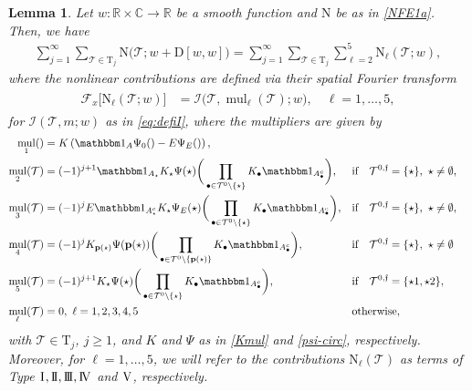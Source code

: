 \documentclass[a4paper,
11pt,  reqno]{amsart}
\makeatletter
\newcommand{\I}{\hspace{0.2mm}\textup{I}\hspace{0.2mm}}
\newcommand{\II}{\textup{I \hspace{-2.9mm} I} }
\newcommand{\III}{\textup{I \hspace{-2.9mm} I \hspace{-2.9mm} I}}
\newcommand{\IV}{\textup{I \hspace{-2.9mm} V}}
\newcommand{\5}{\textup{V}}
\newcommand{\ind}{\mathbbm 1}
\newtheorem{lemma}[theorem]{Lemma}
\theoremstyle{remark}
\newcommand{\R}{\mathbb{R}}
\newcommand{\CC}{\mathbb{C}}
\newcommand{\bul}{\bullet}
\newcommand{\TT}{\mathcal{T}}
\newcommand{\Tr}{\mathrm{T}}
\newcommand{\pb}{\mathbf{p}}
\newcommand{\Ft}{{\mathcal{F}}}
\renewcommand{\l}{\ell}
\newcommand{\ff}{\mathfrak{f}}
\DeclareMathOperator{\mul}{mul}
\def\<#1>{\csname MH@symb@#1\endcsname}
\newcommand{\Ical}{\mathcal{I}}
\numberwithin{equation}{section}
\numberwithin{theorem}{section}
\newcommand{\NN}{\mathrm{N}}
\newcommand{\D}{\mathrm{D}}
\makeatother
\begin{document}
\begin{lemma}
\label{LEM:wint}
Let $w:\R \times \CC\to \R$ be a smooth function and $\NN$ be as in \eqref{NFE1a}.
Then, we have
\begin{align}
\label{wint0a}
\sum_{j=1}^\infty \sum_{\TT\in \Tr_j} \NN\big(\TT; w+
\D[w, w]
\big)
=
\sum_{j=1}^\infty \sum_{\TT\in\Tr_j} \sum_{\ell=2}^5  \NN_\ell(\TT; w),
\end{align}
where the nonlinear contributions are defined via their spatial Fourier transform
\begin{align}
\label{wint0b}
\begin{split}
\Ft_x \big[ \NN_\ell (\TT; w) \big] & =
\Ical \big(\TT, {\mul}_\l(\TT); w \big),\quad \l=1,\dots, 5,
\end{split}
\end{align}
for $\Ical(\TT, m; w)$ as in \eqref{eq:defiI}, 
where the multipliers are given by 
\begin{align}\label{eq:multiplicadores}
    \mul_1(\<1>)&= K\left(\ind_A  \Psi_0(\<1>) - E\Psi_E(\<1>)\right),\\
    \mul_2(\TT)&=(-1)^{j+1} \ind_{A_\star} K_\star\Psi(\star) \bigg( \prod_{\bul \in \TT^0 \setminus\{\star\}}  K_\bul  \ind_{A_\bul^c} \bigg), 
    && \text{if} \quad  \TT^{0,\ff} = \{\star\}, \ \star\neq \emptyset, 
    \\\mul_3(\TT)&=(-1)^{j}E  \ind_{A_\star^c} K_\star\Psi_E(\star) \bigg( \prod_{\bul \in \TT^0 \setminus\{\star\}}  K_\bul  \ind_{A_\bul^c} \bigg), 
    && \text{if} \quad  \TT^{0,\ff} = \{\star\}, \ \star\neq \emptyset, 
    \\
    \mul_4(\TT)&=(-1)^{j}  K_{\pb(\star)}\Psi(\pb(\star)) \bigg( \prod_{\bul \in \TT^0 \setminus\{\pb(\star)\}}  K_\bul  \ind_{A_\bul^c} \bigg),
    &&
    \text{if} \quad  \TT^{0,\ff} = \{\star\},  \ \star\neq \emptyset
    \label{wint0c}
    \\
     \mul_5(\TT)&=(-1)^{j+1}  K_\star\Psi(\star) \bigg( \prod_{\bul \in \TT^0 \setminus\{\star\}}  K_\bul  \ind_{A_\bul^c} \bigg), 
    && \text{if} \quad  \TT^{0,\ff} = \{\star1, \star2\}, 
    \\
    \mul_{\l}(\TT) & = 0, \ \l=1,2,3,4, 5 && \text{otherwise}, 
\end{align}
with $\TT\in \Tr_j$,  $j \ge 1$, and $K$ and $\Psi$ as in \eqref{Kmul} and \eqref{psi-circ}, respectively.
Moreover, for $\l=1,\ldots, 5$, we will refer to the contributions $\NN_\l(\TT) $ as terms of Type $\I,\II,\III,\IV$ and $\5$, respectively. 



\end{lemma}
\end{document}
